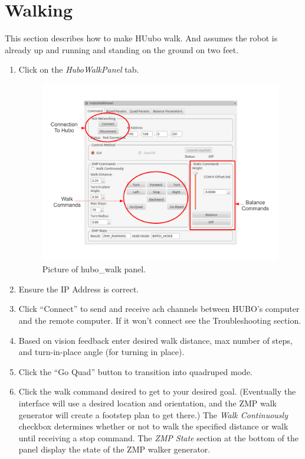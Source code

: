 \documentclass[letterpaper, 10 pt]{report}
\begin{document}
\pagebreak
\section{Walking}
This section describes how to make HUubo walk. And assumes the robot is already up and running and standing on the ground on two feet.
  \begin{enumerate}
    \item Click on the \textit{HuboWalkPanel} tab.
    \begin{figure}[ht]
      \centering
      \includegraphics[width=15.0cm]{figures/hubo-walk.pdf}
      \caption{Picture of hubo\_walk panel.}
      \label{fig:hubo-walk-image}
    \end{figure}
    \item Ensure the IP Address is correct.
    \item Click ``Connect'' to send and receive ach channels between HUBO's computer and the remote computer. If it won't connect see the Troubleshooting section.
    \item Based on vision feedback enter desired walk distance, max number of steps, and turn-in-place angle (for turning in place).
    \item Click the ``Go Quad'' button to transition into quadruped mode.
    \item Click the walk command desired to get to your desired goal. (Eventually the interface will use a desired location and orientation, and the ZMP walk generator will create a footstep plan to get there.) The \textit{Walk Continuously} checkbox determines whether or not to walk the specified distance or walk until receiving a stop command. The \textit{ZMP State} section at the bottom of the panel display the state of the ZMP walker generator.

\end{enumerate}
\end{document}

